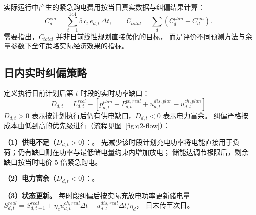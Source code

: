 实际运行中产生的紧急购电费用按当日真实数据与纠偏结果计算：
\begin{equation}
C^{em}_{d}=\sum_{t=1}^{144} 5\,c_t\,e_{d,t}\,\Delta t,\qquad
C_{total}=\sum_{d}\left(C^{plan}_{d}+C^{em}_{d}\right).
\end{equation}
需要指出，$C_{total}$ 并非日前线性规划直接优化的目标，
而是评价不同预测方法与余量参数下全年策略实际经济效果的指标。

\subsection{日内实时纠偏策略}
定义执行日前计划后第 $t$ 时段的实时功率缺口：
\begin{equation}
D_{d,t}=L^{real}_{d,t}-\left[p^{plan}_{d,t}+P^{pv,real}_{d,t}+u^{dis,plan}_{d,t}-u^{ch,plan}_{d,t}\right]
\end{equation}
$D_{d,t}>0$ 表示按计划执行后仍有供电缺口，$D_{d,t}<0$ 表示电力富余。
纠偏严格按成本由低到高的优先级进行（流程见图~\ref{fig:q2-flow}）：

\textbf{（1）供电不足}（$D_{d,t}>0$）：。
先减少该时段计划充电功率将电能直接用于负荷；仍有缺口则在功率与最低储电量约束内增加放电；
储能达调节极限后，剩余缺口按当时电价 5 倍紧急购电。

\textbf{（2）电力富余}（$D_{d,t}<0$）：。

\textbf{（3）状态更新。} 每时段纠偏后按实际充放电功率更新储电量
$S^{real}_{d,t}=S^{real}_{d,t-1}+\eta_c u^{ch,real}_{d,t}\Delta t-u^{dis,real}_{d,t}\Delta t/\eta_d$，
日末传至次日。

